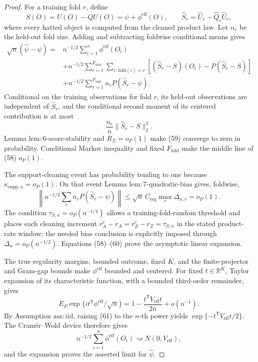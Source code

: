 \documentclass{article}
\begin{document}
\begin{proof}
For a training fold \(r\), define
\[
 S(O)=U(O)-QU(O)=\psi+\phi^{\mathrm{eff}}(O),\qquad
 \widehat S_r=\widehat U_r-\widehat Q_r\widehat U_r, \tag{57}
\]
where every hatted object is computed from the cleaned product law.  Let \(n_r\) be the held-out fold size.  Adding and subtracting foldwise conditional means gives
\[
\begin{aligned}
 \sqrt n(\widehat\psi-\psi)
={}&n^{-1/2}\sum_{i=1}^n\phi^{\mathrm{eff}}(O_i)\\
&+n^{-1/2}\sum_{r=1}^{F_{\mathrm{fold}}}
 \sum_{i:\,\mathrm{fold}(i)=r}
 [(\widehat S_r-S)(O_i)-P(\widehat S_r-S)]\\
&+n^{-1/2}\sum_{r=1}^{F_{\mathrm{fold}}}n_rP(\widehat S_r-\psi). \tag{58}
\end{aligned}
\]
Conditional on the training observations for fold \(r\), its held-out observations are independent of \(\widehat S_r\), and the conditional second moment of its centered contribution is at most
\[
 \frac{n_r}{n}\|\widehat S_r-S\|_2^2. \tag{59}
\]
Lemma \(\mathrm{lem{:}6\mbox{-}score\mbox{-}stability}\) and \(R_\Sigma=o_P(1)\) make (59) converge to zero in probability.  Conditional Markov inequality and fixed \(F_{\mathrm{fold}}\) make the middle line of (58) \(o_P(1)\).

The support-cleaning event has probability tending to one because
\(\kappa_{\mathrm{supp},n}=o_P(1)\).  On that event Lemma \(\mathrm{lem{:}7\mbox{-}quadratic\mbox{-}bias}\) gives, foldwise,
\[
 \left\|n^{-1/2}\sum_rn_rP(\widehat S_r-\psi)\right\|
 \leq\sqrt n\,C_{\mathrm{reg}}\max_r\Delta_{n,r}=o_P(1). \tag{60}
\]
The condition \(\tau_{S,n}=o_P(n^{-1/4})\) allows a training-fold-random threshold and places each cleaning increment
\(r_A^c-r_A=r_Z^c-r_Z=\tau_{S,n}\) in the stated product-rate window; the needed bias conclusion is explicitly imposed through
\(\Delta_n=o_P(n^{-1/2})\).  Equations (58)--(60) prove the asymptotic linear expansion.

The true regularity margins, bounded outcome, fixed \(K\), and the finite-projector and Gram-gap bounds make \(\phi^{\mathrm{eff}}\) bounded and centered.  For fixed \(t\in\mathbb R^K\), Taylor expansion of its characteristic function, with a bounded third-order remainder, gives
\[
 E_P\exp\{it^{\mathsf T}\phi^{\mathrm{eff}}/\sqrt n\}
 =1-\frac{t^{\mathsf T}V_{\mathrm{eff}}t}{2n}+o(n^{-1}). \tag{61}
\]
By Assumption \(\mathrm{ass{:}iid}\), raising (61) to the \(n\)-th power yields
\(\exp\{-t^{\mathsf T}V_{\mathrm{eff}}t/2\}\).  The Cramér--Wold device therefore gives
\[
n^{-1/2}\sum_{i=1}^n\phi^{\mathrm{eff}}(O_i)
\rightsquigarrow N(0,V_{\mathrm{eff}}),
\]
and the expansion proves the asserted limit for \(\widehat\psi\).


\end{proof}
\end{document}
